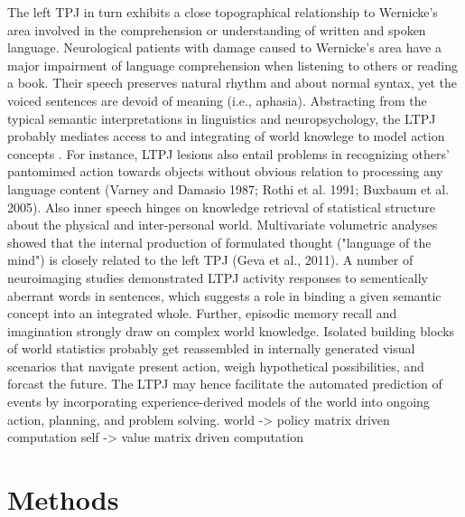 \documentclass{article} %
\begin{document}
The left TPJ in turn exhibits a close topographical relationship to
Wernicke's area
involved in the comprehension or understanding of written and spoken language.
Neurological patients with damage caused to Wernicke's area
have a major impairment of language comprehension
when listening to others or reading a book.
Their speech
preserves natural rhythm and about normal syntax, yet the
voiced sentences are devoid of meaning (i.e., aphasia).
Abstracting from the typical semantic interpretations in linguistics
and neuropsychology,
the LTPJ probably mediates access to and integrating of world knowlege
to model action concepts
\cite{binder2011neurobiology, seghier2013angular}.
For instance, LTPJ lesions also entail problems in recognizing
others' pantomimed action towards objects
without obvious relation to processing any language content
(Varney and Damasio 1987; Rothi et al. 1991; Buxbaum et al. 2005).
%
Also inner speech hinges on knowledge retrieval of statistical structure
about the physical and inter-personal world.
Multivariate volumetric analyses showed that the internal production of
formulated thought ("language of the mind") is closely related to the left TPJ
(Geva et al., 2011).
A number of neuroimaging studies demonstrated LTPJ activity responses
to sementically aberrant words in sentences, which suggests a role
in binding a given semantic concept into an integrated whole.
Further,
episodic memory recall and imagination strongly draw on
complex world knowledge.
Isolated building blocks of world statistics probably get reassembled
in internally generated visual scenarios that
navigate present action, weigh hypothetical possibilities, and forcast the future.
%
The LTPJ may hence facilitate the automated prediction of events
by incorporating experience-derived models of the world
into ongoing action, planning, and problem solving.
world -> policy matrix driven computation
self -> value matrix driven computation


\section{Methods}
\end{document}
